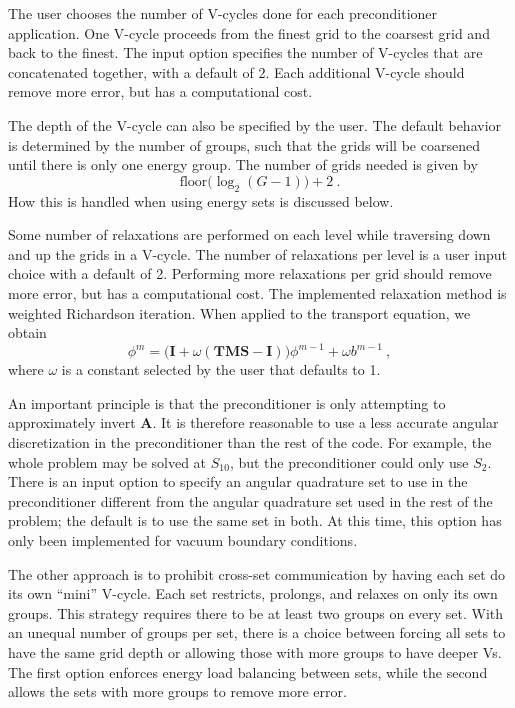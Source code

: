 \documentclass[preprint,12pt]{elsarticle}
\newcommand{\ve}[1]{\ensuremath{\mathbf{#1}}}
\begin{document}
The user chooses the number of V-cycles done for each preconditioner application. One V-cycle proceeds from the finest grid to the coarsest grid and back to the finest. The input option specifies the number of V-cycles that are concatenated together, with a default of 2. Each additional V-cycle should remove more error, but has a computational cost. 

The depth of the V-cycle can also be specified by the user. The default behavior is determined by the number of groups, such that the grids will be coarsened until there is only one energy group. The number of grids needed is given by \cite{BinaryTree2012}
\begin{equation}
  \text{floor}\bigl( \log_{2}(G-1) \bigr) + 2 \:.
  \label{eq:NumGrids}
\end{equation}
%
How this is handled when using energy sets is discussed below. 

Some number of relaxations are performed on each level while traversing down and up the grids in a V-cycle. The number of relaxations per level is a user input choice with a default of 2. Performing more relaxations per grid should remove more error, but has a computational cost. The implemented relaxation method is weighted Richardson iteration. When applied to the transport equation, we obtain
%
\begin{equation}
  \phi^{m} = \bigr(\ve{I} + \omega(\ve{TMS} - \ve{I})\bigl)\phi^{m-1} + \omega b^{m-1} \:,
  \label{eq:relax}
 \end{equation}
%
where $\omega$ is a constant selected by the user that defaults to 1. 

An important principle is that the preconditioner is only attempting to approximately invert $\ve{A}$. It is therefore reasonable to use a less accurate angular discretization in the preconditioner than the rest of the code. For example, the whole problem may be solved at $S_{10}$, but the preconditioner could only use $S_{2}$. There is an input option to specify an angular quadrature set to use in the preconditioner different from the angular quadrature set used in the rest of the problem; the default is to use the same set in both. At this time, this option has only been implemented for vacuum boundary conditions. 

The other approach is to prohibit cross-set communication by having each set do its own ``mini'' V-cycle. Each set restricts, prolongs, and relaxes on only its own groups. This strategy requires there to be at least two groups on every set. With an unequal number of groups per set, there is a choice between forcing all sets to have the same grid depth or allowing those with more groups to have deeper Vs. The first option enforces energy load balancing between sets, while the second allows the sets with more groups to remove more error. 
\end{document}
